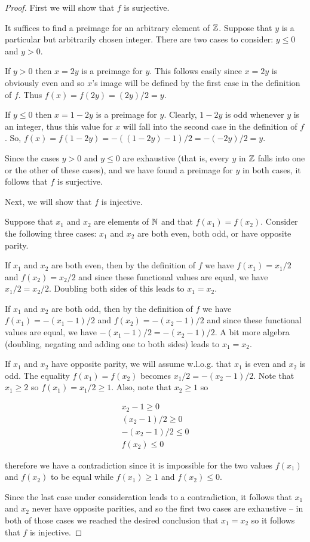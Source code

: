 \begin{proof}
First we will show that $f$ is surjective.
 
It suffices to find a preimage for an arbitrary element of ${\mathbb Z}$.
Suppose that $y$ is a particular but arbitrarily chosen integer.  There 
are two cases to consider: $y\leq 0$ and $y>0$.

If $y>0$ then $x=2y$ is a preimage for $y$.  This follows easily since
$x=2y$ is obviously even and so $x$'s image will be
defined by the first case in the definition of $f$.  Thus $f(x) = f(2y) =
(2y)/2 = y$.

If $y \leq 0$ then $x=1-2y$ is a preimage for $y$.  Clearly, $1-2y$ is odd
whenever $y$ is an integer, thus this value for $x$ will fall into the second 
case in the definition of $f$.  So, $f(x) = f(1-2y) = -((1-2y)-1)/2 = -(-2y)/2 = y$.

Since the cases $y>0$ and $y\leq 0$ are exhaustive (that is, every $y$ in 
${\mathbb Z}$ falls into one or the other of these cases), and we have found
a preimage for $y$ in both cases, it follows that $f$ is surjective.

Next, we will show that $f$ is injective.

Suppose that $x_1$ and $x_2$ are elements of ${\mathbb N}$ and that
$f(x_1)=f(x_2)$.  Consider the following three cases: $x_1$ and $x_2$
are both even, both odd, or have opposite parity.

If $x_1$ and $x_2$ are both even, then by the definition of $f$ we
have $f(x_1) = x_1/2$ and $f(x_2) = x_2/2$ and since these functional
values are equal, we have $x_1/2 = x_2/2$.  Doubling both sides of this
leads to $x_1=x_2$.

If $x_1$ and $x_2$ are both odd, then by the definition of $f$ we
have $f(x_1) = -(x_1-1)/2$ and $f(x_2) = -(x_2-1)/2$ and since these functional
values are equal, we have $-(x_1-1)/2 = -(x_2-1)/2$.  A bit more
algebra (doubling, negating and adding one to both sides) leads to 
$x_1=x_2$. 

If $x_1$ and $x_2$ have opposite parity, we will assume w.l.o.g. that 
$x_1$ is even and $x_2$ is odd.  The equality $f(x_1)=f(x_2)$ becomes
$x_1/2 = -(x_2-1)/2$.  Note that $x_1 \geq 2$ so $f(x_1) = x_1/2 \geq 1$.
Also, note that $x_2 \geq 1$ so 

\begin{gather*}
x_2 - 1 \geq 0 \\
(x_2-1)/2 \geq 0 \\
-(x_2-1)/2 \leq 0 \\
f(x_2) \leq 0
\end{gather*}

\noindent therefore we have a contradiction since it is impossible
for the two values $f(x_1)$ and $f(x_2)$ to be equal while $f(x_1) \geq 1$
and $f(x_2) \leq 0$.

Since the last case under consideration leads to a contradiction, it follows
that $x_1$ and $x_2$ never have opposite parities, and so the first two
cases are exhaustive -- in both of those cases we reached the desired
conclusion that $x_1 = x_2$ so it follows that $f$ is injective.
\end{proof}

